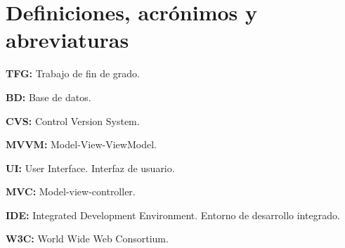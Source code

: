 \section{Definiciones, acr\'{o}nimos y abreviaturas}
\textbf{TFG:} Trabajo de fin de grado.

\textbf{BD:} Base de datos.

\textbf{CVS:} Control Version System.

\textbf{MVVM:} Model-View-ViewModel.

\textbf{UI:} User Interface. Interfaz de usuario.

\textbf{MVC:} Model-view-controller.

\textbf{IDE:} Integrated Development Environment. Entorno de desarrollo integrado.

\textbf{W3C:} World Wide Web Consortium.
 
